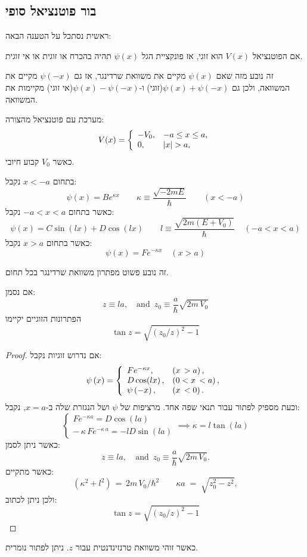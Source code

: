\documentclass{tstextbook}
\begin{document}
\subsection{בור פוטנציאל סופי}

ראשית נסתכל על הטענה הבאה:

\begin{proposition}
אם הפוטנציאל \(V(x)\) הוא זוגי, אז פונקציית הגל \(\psi(x)\) תהיה בהכרח או זוגית או אי זוגית.

\end{proposition}
זה נובע מזה שאם \(\psi(x)\) מקיים את משוואת שרדינגר, אז גם \(\psi(-x)\) מקיים את המשוואה, ולכן גם \(\psi(x)+\psi(-x)\)(זוגי) ו-\(\psi(x)-\psi(-x)\)(אי זוגי) מקיימות את המשוואה. 

\begin{definition}
מערכת עם פוטנציאל מהצורה:
$$V(x)=\left\{\begin{array}{l l}{{-V_{0},}}&{{-a\le x\le a,}}\\ {{0,}}&{{\vert x\vert>a,}}\end{array}\right.$$
כאשר \(V_{0}\) קבוע חיובי.

\end{definition}
\begin{proposition}
בתחום \(x<-a\) נקבל:
$$\psi(x)=B e^{\kappa x}\qquad \kappa\equiv{\frac{\sqrt{-2m E}}{\hbar}}\qquad (x<-a)$$
כאשר בתחום \(-a<x<a\) נקבל:
$$\psi(x)=C\sin(l x)+D\cos(l x)\qquad l\equiv{\frac{\sqrt{2m\left(E+V_{0}\right)}}{\hbar}}\;\;\;\;(-a<x<a)$$
כאשר בתחום \(x>a\) נקבל:
$$\psi(x)=F e^{-\kappa x}\quad(x>a)$$

\end{proposition}
זה נובע פשוט מפתרון משוואת שרדינגר בכל תחום. 

\begin{proposition}
אם נסמן:
$$z\equiv l a,\quad\mathrm{and}\,\,\,z_{0}\equiv\frac{a}{\hbar}\sqrt{2m\,V_{0}}$$
הפתרונות הזוגיים יקיימו
$$\tan z={\sqrt{(z_{0}/z)^{2}-1}}$$

\end{proposition}
\begin{proof}
אם נדרוש זוגיות נקבל:
$$\psi\left(x\right)=\left\{\begin{array}{l l}{{F e^{-\kappa x},}}&{{\left(x\,>a\right),}}\\ {{D\cos(l x)\,,}}&{{\left(0<x\,<a\right),}}\\ {{\psi\left(-x\right),}}&{{\left(x\,<0\right).}}\end{array}\right.$$
וכעת מספיק לפתור עבור תנאי שפה אחד. מרציפות של \(\psi\) ושל הנגזרת שלה ב-\(x=a\), נקבל:
$$\begin{cases}F e^{-\kappa a}=D\cos(l a) \\-\,\kappa\,F e^{-\kappa\,a}=-l D\sin(l a)
\end{cases}\implies \kappa=l\tan(l a)$$
כאשר ניתן לסמן:
$$z\equiv l a,\quad\mathrm{and}\,\,\,z_{0}\equiv\frac{a}{\hbar}\sqrt{2m\,V_{0}}.$$
כאשר מתקיים:
$$\left(\kappa^{2}+l^{2}\right)\,=\,2m\,V_{0}/\hbar^{2}\qquad \kappa a\;=\;\sqrt{z_{0}^{2}-z^{2}},$$
ולכן ניתן לכתוב:
$$\tan z={\sqrt{(z_{0}/z)^{2}-1}}$$

\end{proof}
כאשר זוהי משוואת טרנזינדנטית עבור \(z\). ניתן לפתור נומרית.
\end{document}
